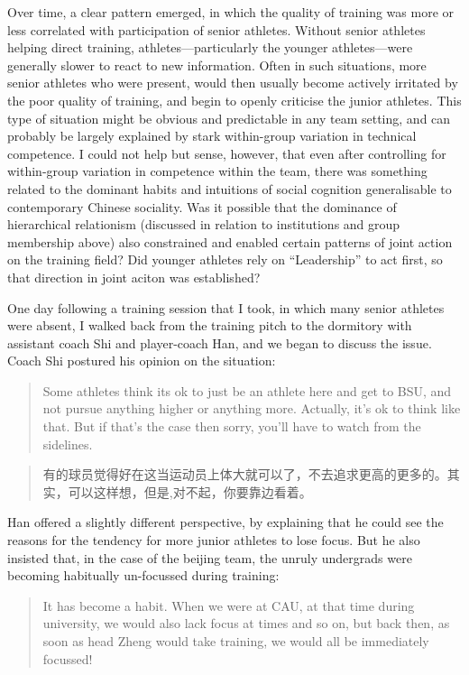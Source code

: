 \begin{CJK}{UTF8}{gbsn}
Over time, a clear pattern emerged, in which the quality of training was more or less correlated with participation of senior athletes. Without senior athletes helping direct training, athletes---particularly the younger athletes---were generally slower to react to new information.  Often in such situations, more senior athletes who were present, would then usually become actively irritated by the poor quality of training, and begin to openly criticise the junior athletes.  This type of situation might be obvious and predictable in any team setting, and can probably be largely explained by stark within-group variation in technical competence.  I could not help but sense, however, that even after controlling for within-group variation in competence within the team, there was something related to the dominant habits and intuitions of social cognition generalisable to contemporary Chinese sociality.  Was it possible that the dominance of hierarchical relationism (discussed in relation to institutions and group membership above) also constrained and enabled certain patterns of joint action on the training field?  Did younger athletes rely on ``Leadership'' to act first, so that direction in joint aciton was established?


One day following a training session that I took, in which many senior athletes were absent,  I walked back from the training pitch to the dormitory with assistant coach Shi and player-coach Han, and we began to discuss the issue.  Coach Shi postured his opinion on the situation:

\begin{quotation}
  Some athletes think its ok to just be an athlete here and get to BSU, and not pursue anything higher or anything more.  Actually, it's ok to think like that. But if that's the case then sorry, you'll have to watch from the sidelines.
\end{quotation}

\begin{quotation}
  有的球员觉得好在这当运动员上体大就可以了，不去追求更高的更多的。其实，可以这样想，但是,对不起，你要靠边看着。
\end{quotation}

Han offered a slightly different perspective, by explaining that he could see the reasons for the tendency for more junior athletes to lose focus. But he also insisted that, in the case of the beijing team, the unruly undergrads were becoming habitually un-focussed during training:

\begin{quotation}
  It has become a habit.  When we were at CAU, at that time during university, we would also lack focus at times and so on, but back then, as soon as head Zheng would take training, we would all be immediately focussed!
\end{quotation}


\end{CJK}
